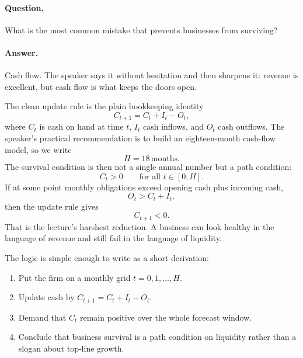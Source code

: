 \paragraph{Question.} What is the most common mistake that prevents businesses from surviving?

\paragraph{Answer.} Cash flow. The speaker says it without hesitation and then sharpens it: revenue is excellent, but cash flow is what keeps the doors open.

The clean update rule is the plain bookkeeping identity
\begin{equation}
C_{t+1} = C_t + I_t - O_t,
\end{equation}
where $C_t$ is cash on hand at time $t$, $I_t$ cash inflows, and $O_t$ cash outflows. The speaker's practical recommendation is to build an eighteen-month cash-flow model, so we write
\begin{equation}
H = 18\,\mathrm{months}.
\end{equation}
The survival condition is then not a single annual number but a path condition:
\begin{equation}
C_t > 0 \qquad \text{for all } t \in [0,H].
\end{equation}
If at some point monthly obligations exceed opening cash plus incoming cash,
\begin{equation}
O_t > C_t + I_t,
\end{equation}
then the update rule gives
\begin{equation}
C_{t+1} < 0.
\end{equation}
That is the lecture's harshest reduction. A business can look healthy in the language of revenue and still fail in the language of liquidity.

The logic is simple enough to write as a short derivation:
\begin{enumerate}
\item Put the firm on a monthly grid $t=0,1,\dots,H$.
\item Update cash by $C_{t+1}=C_t+I_t-O_t$.
\item Demand that $C_t$ remain positive over the whole forecast window.
\item Conclude that business survival is a path condition on liquidity rather than a slogan about top-line growth.
\end{enumerate}

